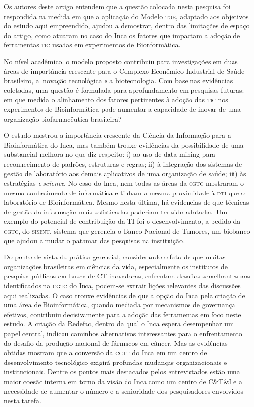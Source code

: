 \documentclass{article}
\begin{document}
Os autores deste artigo entendem que a questão colocada nesta pesquisa foi
respondida na medida em que a aplicação do Modelo \textsc{toe}, adaptado aos objetivos do
estudo aqui empreendido, ajudou a demostrar, dentro das limitações de espaço do
artigo, como atuaram no caso do Inca os fatores que impactam a adoção de
ferramentas \textsc{tic} usadas em experimentos de Bionformática.

No nível acadêmico, o modelo proposto contribuiu para investigações em duas
áreas de importância crescente para o Complexo Econômico-Industrial de Saúde
brasileiro, a inovação tecnológica e a biotecnologia. Com base nas evidências
coletadas, uma questão é formulada para aprofundamento em pesquisas futuras: em
que medida o alinhamento dos fatores pertinentes à adoção das \textsc{tic} nos
experimentos de Bioinformática pode aumentar a capacidade de inovar de uma
organização biofarmacêutica brasileira?

O estudo mostrou a importância crescente da Ciência da Informação para a
Bioinformática do Inca, mas também trouxe evidências da possibilidade de uma
substancial melhora no que diz respeito: i) ao uso de data mining para
reconhecimento de padrões, estruturas e regras; ii) à integração dos sistemas de
gestão de laboratório aos demais aplicativos de uma organização de saúde; iii)
às estratégias \textit{e.science}. No caso do Inca, nem todas as áreas da \textsc{cgtc} mostraram o mesmo conhecimento de
informática e tinham a mesma proximidade à \textsc{dti} que o laboratório de
Bioinformática. Mesmo nesta última, há evidencias de que técnicas de gestão da
informação mais sofisticadas poderiam ter sido adotadas. Um exemplo do potencial
de contribuição da TI foi o desenvolvimento, a pedido da \textsc{cgtc}, do \textsc{sisbnt},
sistema que gerencia o Banco Nacional de Tumores, um biobanco que ajudou a mudar
o patamar das pesquisas na instituição\textit{.}

Do ponto de vista da prática gerencial, considerando o fato de que muitas
organizações brasileiras em ciências da vida, especialmente os institutos de
pesquisa públicos em busca de CT inovadoras, enfrentam desafios semelhantes aos
identificados na \textsc{cgtc} do Inca, podem-se extrair lições relevantes das discussões
aqui realizadas. O caso trouxe evidências de que a opção do Inca pela criação de
uma área de Bioinformática, quando mediada por mecanismos de governança
efetivos, contribuiu decisivamente para a adoção das ferramentas em foco neste
estudo. A criação da Redefac, dentro da qual o Inca espera desempenhar um papel
central, indicou caminhos alternativos interessantes para o enfrentamento do
desafio da produção nacional de fármacos em câncer. Mas as evidências obtidas
mostram que a conversão da \textsc{cgtc} do Inca em um centro de desenvolvimento
tecnológico exigirá profundas mudanças organizacionais e institucionais. Dentre
os pontos mais destacados pelos entrevistados estão uma maior coesão interna em
torno da visão do Inca como um centro de C\&T\&I e a necessidade de aumentar o
número e a senioridade dos pesquisadores envolvidos nesta tarefa.
\end{document}
